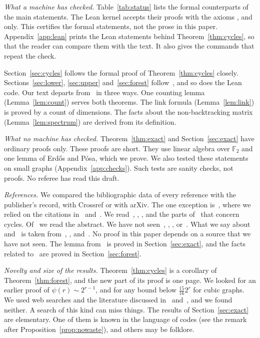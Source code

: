 \documentclass[11pt]{article}
\theoremstyle{definition}
\theoremstyle{remark}
\numberwithin{equation}{section}
\begin{document}
\emph{What a machine has checked.} Table~\ref{tab:status} lists the formal counterparts of the main
statements. The Lean kernel accepts their proofs with the axioms ,
 and  only. This certifies the formal statements, not the
prose in this paper. Appendix~\ref{app:lean} prints the Lean statements behind
Theorem~\ref{thm:cycles}, so that the reader can compare them with the text. It also gives the
commands that repeat the check.

Section~\ref{sec:cycles} follows the formal proof of Theorem~\ref{thm:cycles} closely.
Sections~\ref{sec:lower}, \ref{sec:upper} and~\ref{sec:forest} follow~\cite{KNT}, and so does the
Lean code. Our text departs from~\cite{KNT} in three ways. One counting lemma
(Lemma~\ref{lem:count}) serves both theorems. The link formula (Lemma~\ref{lem:link}) is proved by a
count of dimensions. The facts about the non-backtracking matrix (Lemma~\ref{lem:spectrum}) are
derived from its definition.

\emph{What no machine has checked.} Theorem~\ref{thm:exact} and Section~\ref{sec:exact} have
ordinary proofs only. These proofs are short. They use linear algebra over $\mathbb{F}_2$ and one
lemma of Erd\H{o}s and P\'osa, which we prove. We also tested these statements on small graphs
(Appendix~\ref{app:checks}). Such tests are sanity checks, not proofs. No referee has read this
draft.

\emph{References.} We compared the bibliographic data of every reference with the publisher's
record, with Crossref or with arXiv. The one exception is~\cite{ES}, where we relied on the
citations in~\cite{AACST} and~\cite{HK}. We read~\cite{AACST}, \cite{Griffin}, \cite{KNT}, and the
parts of~\cite{HK} that concern cycles. Of~\cite{AT} we read the abstract. We have not
seen~\cite{Bass}, \cite{Bondy}, \cite{ES}, \cite{EP} or~\cite{KS}. What we say about~\cite{Bondy}
and~\cite{ES} is taken from~\cite{AACST}, \cite{Bloom}, \cite{HK} and~\cite{KNT}. No proof in this
paper depends on a source that we have not seen. The lemma from~\cite{EP} is proved in
Section~\ref{sec:exact}, and the facts related to~\cite{Bass,KS} are proved in
Section~\ref{sec:forest}.

\emph{Novelty and size of the results.} Theorem~\ref{thm:cycles} is a corollary of
Theorem~\ref{thm:forest}, and the new part of its proof is one page. We looked for an earlier proof
of $\psi(r)\sim2^{r-1}$, and for any bound below $\frac{15}{16}2^{r}$ for cubic graphs. We used web
searches and the literature discussed in~\cite{AACST} and~\cite{HK}, and we found neither. A search
of this kind can miss things. The results of Section~\ref{sec:exact} are elementary. One of them is
known in the language of codes (see the remark after Proposition~\ref{prop:nowaste}), and others
may be folklore.
\end{document}
